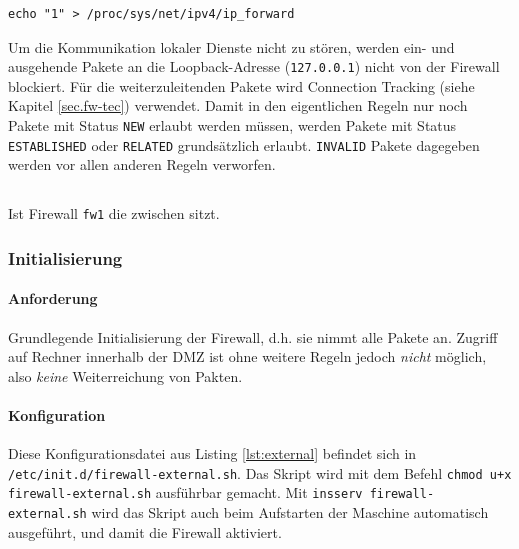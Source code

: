 \begin{verbatim}
echo "1" > /proc/sys/net/ipv4/ip_forward
\end{verbatim}

\noindent Um die Kommunikation lokaler Dienste nicht zu stören, werden ein-
und ausgehende Pakete an die Loopback-Adresse ({\tt 127.0.0.1}) nicht von der
Firewall blockiert.
Für die weiterzuleitenden Pakete wird Connection Tracking
(siehe Kapitel \ref{sec.fw-tec}) verwendet.
Damit in den eigentlichen Regeln nur noch Pakete mit Status {\tt NEW} erlaubt
werden müssen, werden Pakete mit Status {\tt ESTABLISHED} oder {\tt RELATED}
grundsätzlich erlaubt.
{\tt INVALID} Pakete dagegeben werden vor allen anderen Regeln verworfen.




\subsection{\fwa}

Ist Firewall {\tt fw1} die zwischen \fwa sitzt.


\subsubsection{Initialisierung}

\paragraph{Anforderung} Grundlegende Initialisierung der Firewall, d.h.
sie nimmt alle Pakete an. Zugriff auf Rechner innerhalb der DMZ ist ohne
weitere Regeln jedoch \emph{nicht} möglich, also \emph{keine} Weiterreichung von
Pakten.

\paragraph{Konfiguration} Diese Konfigurationsdatei aus Listing \ref{lst:external}
befindet sich in {\tt /etc/init.d/firewall-external.sh}.
Das Skript wird mit dem Befehl {\tt chmod u+x firewall-external.sh}
ausführbar gemacht. Mit {\tt insserv firewall-external.sh}
wird das Skript auch beim Aufstarten der Maschine automatisch ausgeführt,
und damit die Firewall aktiviert.



